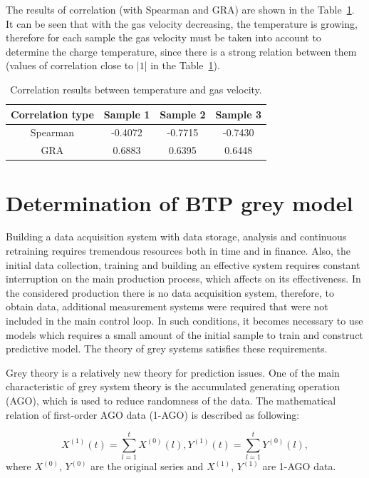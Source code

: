 \documentclass[AMS,STIX2COL]{WileyNJD-v2}
\begin{document}
The results of correlation (with Spearman and GRA) are shown in the Table~\ref{tabCor}. It can be seen that with the gas velocity decreasing, the temperature is growing, therefore for each sample the gas velocity must be taken into account to determine the charge temperature, since there is a strong relation between them (values of correlation close to $|1$| in the Table~\ref{tabCor}).

	\begin{center}
	\begin{table}[t]
	\centering
	\caption{Correlation results between temperature and gas velocity.} \label{tabCor}
		\begin{tabular*}{500pt}{@{\extracolsep\fill}cccc@{\extracolsep\fill}}
			\toprule
			\textbf{Correlation type} & \textbf{Sample 1}& \textbf{Sample 2}& \textbf{Sample 3} \\
			\midrule
			Spearman& -0.4072& -0.7715&  -0.7430\\
			GRA& 0.6883& 0.6395& 0.6448\\
			\bottomrule
		\end{tabular*}		
\end{table}
\end{center}


\section{Determination of BTP grey model} \label{GreyModel}
Building a data  acquisition system with data storage, analysis and continuous retraining requires tremendous resources both in time and in finance. Also, the initial data collection, training and building an effective system requires constant interruption on the main production process, which affects on its effectiveness. In the considered production there is no data acquisition system, therefore, to obtain data, additional measurement systems were required that were not included in the main control loop. In such conditions, it becomes necessary to use models which requires a small amount of the initial sample to train and construct predictive model. The theory of grey systems satisfies these requirements.

Grey theory is a relatively new theory for prediction issues. One of the main characteristic of grey system theory is the accumulated generating operation (AGO), which is used to reduce randomness of the data. The mathematical relation of first-order AGO data (1-AGO) is described as following:

\begin{equation}
X^{(1)}(t)=\sum_{l=1}^{t}X^{(0)}(l),
Y^{(1)}(t)=\sum_{l=1}^{t}Y^{(0)}(l),
\end{equation}
where $X^{(0)}$, $Y^{(0)}$ are the original series and  $X^{(1)}$,  $Y^{(1)}$  are 1-AGO data.
\end{document}
